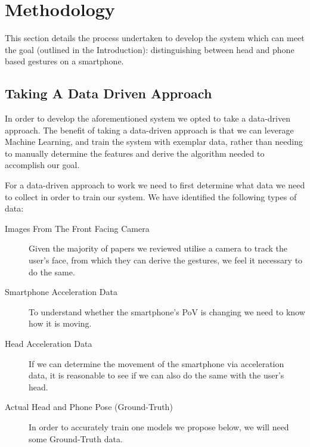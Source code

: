 \section{Methodology} %



This section details the process undertaken to develop the system which can meet the goal (outlined in the Introduction): distinguishing between head and phone based gestures on a smartphone.

\subsection{Taking A Data Driven Approach}
In order to develop the aforementioned system we opted to take a data-driven approach. The benefit of taking a data-driven approach is that we can leverage Machine Learning, and train the system with exemplar data, rather than needing to manually determine the features and derive the algorithm needed to accomplish our goal.

For a data-driven approach to work we need to first determine what data we need to collect in order to train our system. We have identified the following types of data:
\begin{description}
    \item[Images From The Front Facing Camera]\nl Given the majority of papers we reviewed  utilise a camera to track the user's face, from which they can derive the gestures, we feel it necessary to do the same.
    \item[Smartphone Acceleration Data]\nl To understand whether the smartphone's PoV is changing we need to know how it is moving. 
    \item[Head Acceleration Data]\nl If we can determine the movement of the smartphone via acceleration data, it is reasonable to see if we can also do the same with the user's head.
    \item[Actual Head and Phone Pose (Ground-Truth)]\nl In order to accurately train one models we propose below, we will need some Ground-Truth data.
\end{description}

